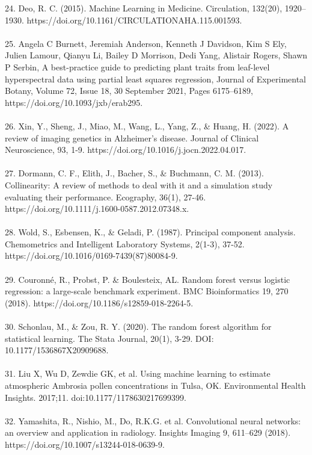 \documentclass[12pt,a4paper]{report}
\begin{document}
24. Deo, R. C. (2015). Machine Learning in Medicine. Circulation, 132(20), 1920–1930. https://doi.org/10.1161/CIRCULATIONAHA.115.001593. \\
\\
25. Angela C Burnett, Jeremiah Anderson, Kenneth J Davidson, Kim S Ely, Julien Lamour, Qianyu Li, Bailey D Morrison, Dedi Yang, Alistair Rogers, Shawn P Serbin, A best-practice guide to predicting plant traits from leaf-level hyperspectral data using partial least squares regression, Journal of Experimental Botany, Volume 72, Issue 18, 30 September 2021, Pages 6175–6189, https://doi.org/10.1093/jxb/erab295. \\
\\
26. Xin, Y., Sheng, J., Miao, M., Wang, L., Yang, Z., \& Huang, H. (2022). A review of imaging genetics in Alzheimer's disease. Journal of Clinical Neuroscience, 93, 1-9. https://doi.org/10.1016/j.jocn.2022.04.017. \\
\\
27. Dormann, C. F., Elith, J., Bacher, S., \& Buchmann, C. M. (2013). Collinearity: A review of methods to deal with it and a simulation study evaluating their performance. Ecography, 36(1), 27-46. https://doi.org/10.1111/j.1600-0587.2012.07348.x. \\
\\
28. Wold, S., Esbensen, K., \& Geladi, P. (1987). Principal component analysis. Chemometrics and Intelligent Laboratory Systems, 2(1-3), 37-52. https://doi.org/10.1016/0169-7439(87)80084-9. \\
\\
29. Couronné, R., Probst, P. \& Boulesteix, AL. Random forest versus logistic regression: a large-scale benchmark experiment. BMC Bioinformatics 19, 270 (2018). https://doi.org/10.1186/s12859-018-2264-5.\\
\\
30. Schonlau, M., \& Zou, R. Y. (2020). The random forest algorithm for statistical learning. The Stata Journal, 20(1), 3-29. DOI: 10.1177/1536867X20909688. \\
\\
31. Liu X, Wu D, Zewdie GK, et al. Using machine learning to estimate atmospheric Ambrosia pollen concentrations in Tulsa, OK. Environmental Health Insights. 2017;11. doi:10.1177/1178630217699399. \\
\\
32. Yamashita, R., Nishio, M., Do, R.K.G. et al. Convolutional neural networks: an overview and application in radiology. Insights Imaging 9, 611–629 (2018). https://doi.org/10.1007/s13244-018-0639-9.\\
\end{document}
